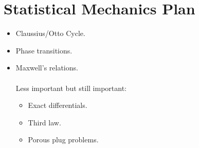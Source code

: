 \documentclass[paper=a4 wide, fontsize=12pt]{scrartcl}
\numberwithin{equation}{section} %
\numberwithin{figure}{section} %
\numberwithin{table}{section} %
\begin{document}



\section*{Statistical Mechanics Plan}

\begin{itemize}
\item Claussius/Otto Cycle.
\item Phase transitions.
\item Maxwell's relations.\\
		\\
	 Less important but still important:
	\begin{itemize}
		\item Exact differentials.
		\item Third law.
		\item Porous plug problems.
	\end{itemize}
\end{itemize}



\end{document}

